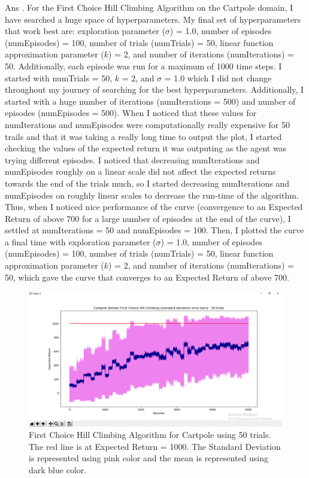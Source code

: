 \documentclass[]{article}
\begin{document}
\begin{enumerate}
	{
		\color{blue}
		Ans . For the First Choice Hill Climbing Algorithm on the Cartpole domain, I have searched a huge space of hyperparameters. My final set of hyperparameters that work best are: exploration parameter ($\sigma$) = 1.0, number of episodes (numEpisodes) = 100, number of trials (numTrials) = 50, linear function approximation parameter ($k$) = 2, and number of iterations (numIterations) = 50. Additionally, each episode was run for a maximum of 1000 time steps. I started with numTrials = 50, $k$ = 2, and $\sigma$ = 1.0  which I did not change throughout my journey of searching for the best hyperparameters. Additionally,  I started with a huge number of iterations (numIterations = 500) and number of episodes (numEpisodes = 500). When I noticed that these values for numIterations and numEpisodes were computationally really expensive for 50 trails and that it was taking a really long time to output the plot, I started checking the values of the expected return it was outputing as the agent was trying different episodes. I noticed that decreasing numIterations and numEpisodes roughly on a linear scale did not affect the expected returns towards the end of the trials much, so I started decreasing numIterations and numEpisodes on roughly linear scales to decrease the run-time of the algorithm. Thus, when I noticed nice performance of the curve (convergence to an Expected Return of above 700 for a large number of episodes at the end of the curve), I settled at numIterations = 50 and numEpisodes = 100. Then, I plotted the curve a final time with exploration parameter ($\sigma$) = 1.0, number of episodes (numEpisodes) = 100, number of trials (numTrials) = 50, linear function approximation parameter ($k$) = 2, and number of iterations (numIterations) = 50, which gave the curve that converges to an Expected Return of above 700.
		
		\begin{figure}[H]
		    \centering
		    \includegraphics[width=1.0\textwidth]{FCHC Cartpole Plot.png}
		    \caption{First Choice Hill Climbing Algorithm for Cartpole using 50 trials. The red line is  at Expected Return = 1000. The Standard Deviation is represented using pink color and the mean is represented using dark blue color.}
		    \label{fig: First Choice Hill Climbing Algorithm for Cartpole}
		\end{figure}

}
\end{enumerate}
\end{document}

